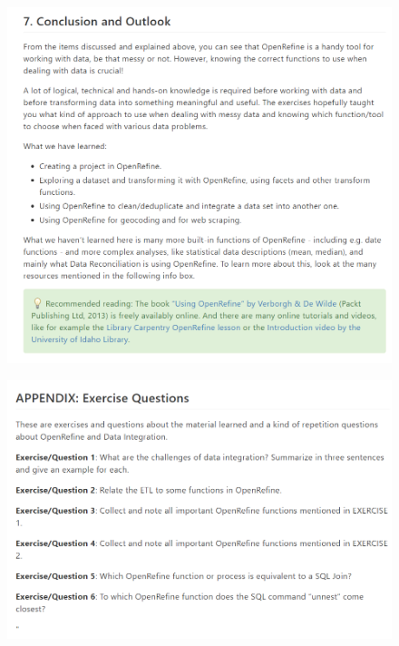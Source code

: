 \begin{figure}[H]
    \includegraphics[width=\linewidth]{./Figures/Appendices/worksheet/59.png}
\end{figure}
\begin{figure}[H]
    \includegraphics[width=\linewidth]{./Figures/Appendices/worksheet/60.png}
\end{figure}